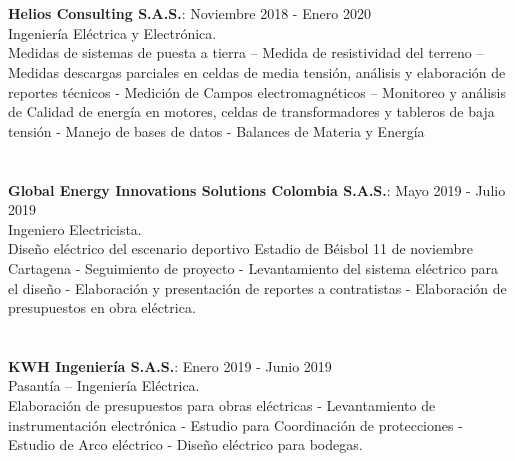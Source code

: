 \documentclass[margin]{res}
\begin{document}
\begin{resume}
\newpage

\section{\centering}
\hfill \break
\textbf{Helios Consulting S.A.S.}: \hfill Noviembre 2018 - Enero 2020
\\Ingeniería Eléctrica y Electrónica.
\\Medidas de sistemas de puesta a tierra – Medida de resistividad del terreno – Medidas descargas parciales en celdas de media tensión, análisis y elaboración de reportes técnicos - Medición de Campos electromagnéticos – Monitoreo y análisis de Calidad de energía en motores, celdas de transformadores y tableros de baja tensión - Manejo de bases de datos - Balances de Materia y Energía 

\section{\centering}
\hfill \break
\textbf{Global Energy Innovations Solutions Colombia S.A.S.}: \hfill Mayo 2019 - Julio 2019
\\ Ingeniero Electricista.
\\Diseño eléctrico del escenario deportivo Estadio de Béisbol 11 de noviembre Cartagena - Seguimiento de proyecto - Levantamiento del sistema eléctrico para el diseño - Elaboración y presentación de reportes a contratistas - Elaboración de presupuestos en obra eléctrica.

\section{\centering}
\hfill \break
\textbf{KWH Ingeniería S.A.S.}: \hfill Enero 2019 - Junio 2019
\\Pasantía – Ingeniería Eléctrica.
\\Elaboración de presupuestos para obras eléctricas - Levantamiento de instrumentación electrónica - Estudio para Coordinación de protecciones - Estudio de Arco eléctrico - Diseño eléctrico para bodegas. 


\end{resume}
\end{document}
